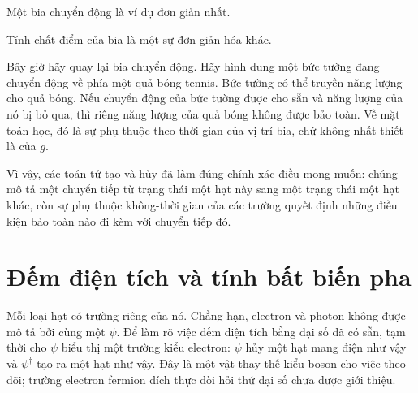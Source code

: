 Một bia chuyển động là ví dụ đơn giản nhất.

\begin{classroomqa}
\end{classroomqa}

Tính chất điểm của bia là một sự đơn giản hóa khác.

\begin{classroomqa}
\end{classroomqa}

Bây giờ hãy quay lại bia chuyển động. Hãy hình dung một bức tường đang chuyển động về phía một quả bóng tennis. Bức tường có thể truyền năng lượng cho quả bóng. Nếu chuyển động của bức tường được cho sẵn và năng lượng của nó bị bỏ qua, thì riêng năng lượng của quả bóng không được bảo toàn. Về mặt toán học, đó là sự phụ thuộc theo thời gian của vị trí bia, chứ không nhất thiết là của \(g\).

Vì vậy, các toán tử tạo và hủy đã làm đúng chính xác điều mong muốn: chúng mô tả một chuyển tiếp từ trạng thái một hạt này sang một trạng thái một hạt khác, còn sự phụ thuộc không-thời gian của các trường quyết định những điều kiện bảo toàn nào đi kèm với chuyển tiếp đó.

\section{Đếm điện tích và tính bất biến pha}

Mỗi loại hạt có trường riêng của nó. Chẳng hạn, electron và photon không được mô tả bởi cùng một \(\psi\). Để làm rõ việc đếm điện tích bằng đại số đã có sẵn, tạm thời cho \(\psi\) biểu thị một trường kiểu electron: \(\psi\) hủy một hạt mang điện như vậy và \(\psi^\dagger\) tạo ra một hạt như vậy. Đây là một vật thay thế kiểu boson cho việc theo dõi; trường electron fermion đích thực đòi hỏi thứ đại số chưa được giới thiệu.


